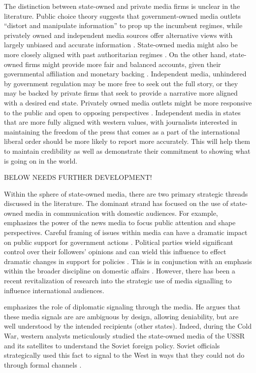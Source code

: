 \documentclass[12pt]{article}
\begin{document}
The distinction between state-owned and private media firms is unclear in the literature. Public choice theory suggests that government-owned media outlets “distort and manipulate information” to prop up the incumbent regimes, while privately owned and independent media sources offer alternative views with largely unbiased and accurate information \autocite{djankov_who_2003}. State-owned media might also be more closely aligned with past authoritarian regimes \autocite{moehler_whose_2011}. On the other hand, state-owned firms might provide more fair and balanced accounts, given their governmental affiliation and monetary backing \autocite{djankov_who_2003}. Independent media, unhindered by government regulation may be more free to seek out the full story, or they may be backed by private firms that seek to provide a narrative more aligned with a desired end state. Privately owned media outlets might be more responsive to the public and open to opposing perspectives \autocite{moehler_whose_2011}. Independent media in states that are more fully aligned with western values, with journalists interested in maintaining the freedom of the press that comes as a part of the international liberal order should be more likely to report more accurately. This will help them to maintain credibility as well as demonstrate their commitment to showing what is going on in the world. 

BELOW NEEDS FURTHER DEVELOPMENT!

Within the sphere of state-owned media, there are two primary strategic threads discussed in the literature. The dominant strand has focused on the use of state-owned media in communication with domestic audiences. For example, \citet{mccombs_agenda-setting_2002} emphasizes the power of the news media to focus public attention and shape perspectives. Careful framing of issues within media can have a dramatic impact on public support for government actions \citep{gershkoff_shaping_2005}. Political parties wield significant control over their followers' opinions and can wield this influence to effect dramatic changes in support for policies \citep{slothuus_how_2021}. This is in conjunction with an emphasis within the broader discipline on domestic affairs \citep{tomz_public_2020, de_mesquita_testing_2004}. However, there has been a recent revitalization of research into the strategic use of media signalling to influence international audiences. 

\citet{cohen_theatre_1987} emphasizes the role of diplomatic signaling through the media. He argues that these media signals are are ambiguous by design, allowing deniability, but are well understood by the intended recipients (other states). Indeed, during the Cold War, western analysts meticulously studied the state-owned media of the USSR and its satellites to understand the Soviet foreign policy. Soviet officials strategically used this fact to signal to the West in ways that they could not do through formal channels \citep{cohen_theatre_1987}.
\end{document}
